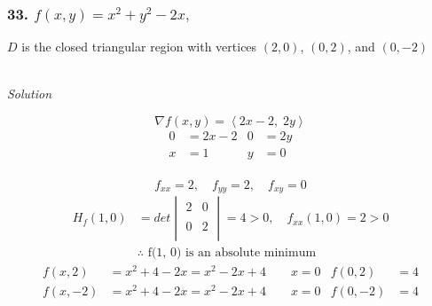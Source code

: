\documentclass{article}
\newcommand\vv[1]{\left\langle #1 \right\rangle}
\newcommand{\solution}{\centerline{\textit{Solution}}}
\newcommand{\also}{,\quad}
\begin{document}
{{{\subsubsection*{33. $f(x,y) = x^2+y^2-2x,\quad$}
$D$ is the closed triangular
region with vertices $(2,0)$, $(0,2)$, and $(0,-2)$ \\\\
\solution
\vspace{1em}
\[
    \nabla f(x,y) = \vv{2x-2,\; 2y}
\]
\begin{align*}
    0 &= 2x- 2 & 0 &= 2y \\
    x &= 1 & y &= 0
\end{align*}
 \\
\[
    f_{xx}=2\also f_{yy} = 2\also f_{xy} = 0
\]
\begin{align*}
    H_f(1,0) &= det\begin{vmatrix}
    2 & 0 \\\\
    0 & 2 \\
\end{vmatrix} = 4 > 0\also f_{xx}(1,0)=2 > 0 \\
             &\therefore\text{ f(1, 0) is an absolute minimum}
\end{align*}
\begin{align*}
    f(x, 2) &= x^2 + 4 - 2x = x^2 -2x+4\qquad x=0 &  f(0,2) &= 4 \\
    f(x, -2) &= x^2 + 4 - 2x = x^2 -2x+4\qquad x=0 & f(0,-2) &= 4
\end{align*}
}}}
\end{document}
